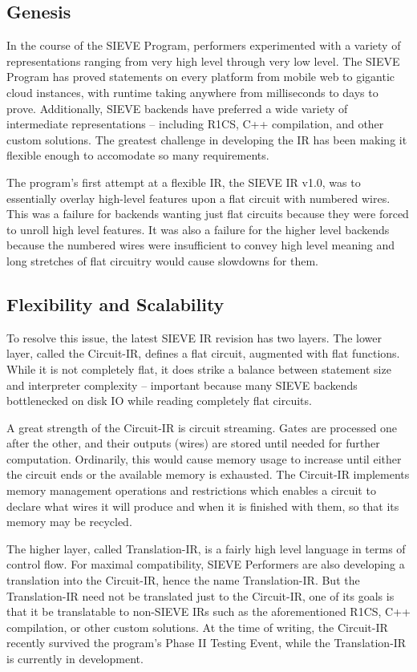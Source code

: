 \subsection{Genesis}

In the course of the SIEVE Program, performers experimented with a variety of representations ranging from very high level through very low level.
The SIEVE Program has proved statements on every platform from mobile web to gigantic cloud instances, with runtime taking anywhere from milliseconds to days to prove.
Additionally, SIEVE backends have preferred a wide variety of intermediate representations -- including R1CS, C++ compilation, and other custom solutions.
The greatest challenge in developing the IR has been making it flexible enough to accomodate so many requirements.

The program's first attempt at a flexible IR, the SIEVE IR v1.0, was to essentially overlay high-level features upon a flat circuit with numbered wires.
This was a failure for backends wanting just flat circuits because they were forced to unroll high level features.
It was also a failure for the higher level backends because the numbered wires were insufficient to convey high level meaning and long stretches of flat circuitry would cause slowdowns for them.

\subsection{Flexibility and Scalability}

To resolve this issue, the latest SIEVE IR revision has two layers.
The lower layer, called the Circuit-IR, defines a flat circuit, augmented with flat functions.
While it is not completely flat, it does strike a balance between statement size and interpreter complexity -- important because many SIEVE backends bottlenecked on disk IO while reading completely flat circuits.

A great strength of the Circuit-IR is circuit streaming.
Gates are processed one after the other, and their outputs (wires) are stored until needed for further computation.
Ordinarily, this would cause memory usage to increase until either the circuit ends or the available memory is exhausted.
The Circuit-IR implements memory management operations and restrictions which enables a circuit to declare what wires it will produce and when it is finished with them, so that its memory may be recycled.

The higher layer, called Translation-IR, is a fairly high level language in terms of control flow.
For maximal compatibility, SIEVE Performers are also developing a translation into the Circuit-IR, hence the name Translation-IR.
But the Translation-IR need not be translated just to the Circuit-IR, one of its goals is that it be translatable to non-SIEVE IRs such as the aforementioned R1CS, C++ compilation, or other custom solutions.
At the time of writing, the Circuit-IR recently survived the program's Phase II Testing Event, while the Translation-IR is currently in development.

